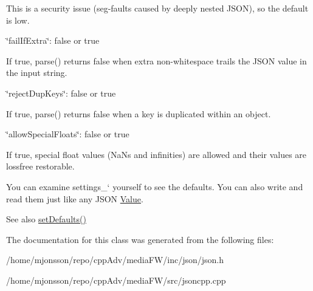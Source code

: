 \begin{DoxyItemize}
\begin{DoxyItemize}
\item This is a security issue (seg-\/faults caused by deeply nested J\+S\+ON), so the default is low.
\end{DoxyItemize}
\item {\ttfamily \char`\"{}fail\+If\+Extra\char`\"{}\+: false or true}
\begin{DoxyItemize}
\item If true, {\ttfamily parse()} returns false when extra non-\/whitespace trails the J\+S\+ON value in the input string.
\end{DoxyItemize}
\item {\ttfamily \char`\"{}reject\+Dup\+Keys\char`\"{}\+: false or true}
\begin{DoxyItemize}
\item If true, {\ttfamily parse()} returns false when a key is duplicated within an object.
\end{DoxyItemize}
\item {\ttfamily \char`\"{}allow\+Special\+Floats\char`\"{}\+: false or true}
\begin{DoxyItemize}
\item If true, special float values (Na\+Ns and infinities) are allowed and their values are lossfree restorable.
\end{DoxyItemize}
\end{DoxyItemize}

You can examine \textquotesingle{}settings\+\_\+` yourself to see the defaults. You can also write and read them just like any J\+S\+ON \hyperlink{classJson_1_1Value}{Value}. \begin{DoxySeeAlso}{See also}
\hyperlink{classJson_1_1CharReaderBuilder_a03ff031e06aabff989ab4addc87294ab}{set\+Defaults()} 
\end{DoxySeeAlso}


The documentation for this class was generated from the following files\+:\begin{DoxyCompactItemize}
\item 
/home/mjonsson/repo/cpp\+Adv/media\+F\+W/inc/json/json.\+h\item 
/home/mjonsson/repo/cpp\+Adv/media\+F\+W/src/jsoncpp.\+cpp\end{DoxyCompactItemize}
